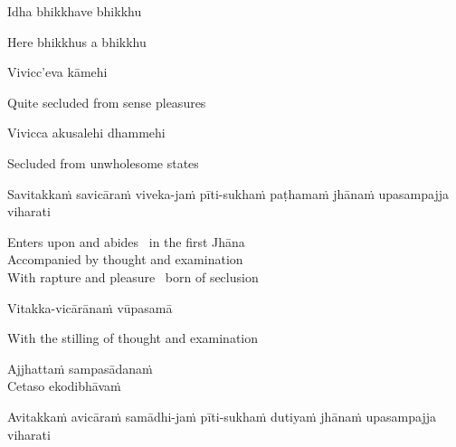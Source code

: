 Idha bhikkhave bhikkhu

\begin{english}
  Here bhikkhus a bhikkhu
\end{english}

Vivicc'eva\makeatletter\hyperlink{endnote64-appendix}\makeatother\thinspace
kāmehi

\begin{english}
  Quite secluded from sense pleasures
\end{english}

Vivicca akusalehi dhammehi

\begin{english}
  Secluded from unwholesome states
\end{english}

\begin{pali-hang}
  Savitakkaṁ savicāraṁ viveka-jaṁ pīti-sukhaṁ paṭhamaṁ jhānaṁ upasampajja viharati
\end{pali-hang}

\begin{english-verses}
  Enters upon and abides \breathmark\ in the first Jhāna\\
  Accompanied by thought and examination\\
  With rapture and pleasure \breathmark\ born of seclusion
\end{english-verses}

Vitakka-vicārānaṁ vūpasamā

\begin{english}
  With the stilling of thought and examination
\end{english}

Ajjhattaṁ sampasādanaṁ\\
Cetaso ekodibhāvaṁ
\begin{pali-hangtogether}
  Avitakkaṁ avicāraṁ samādhi-jaṁ pīti-sukhaṁ dutiyaṁ jhānaṁ upasampajja viharati
\end{pali-hangtogether}

